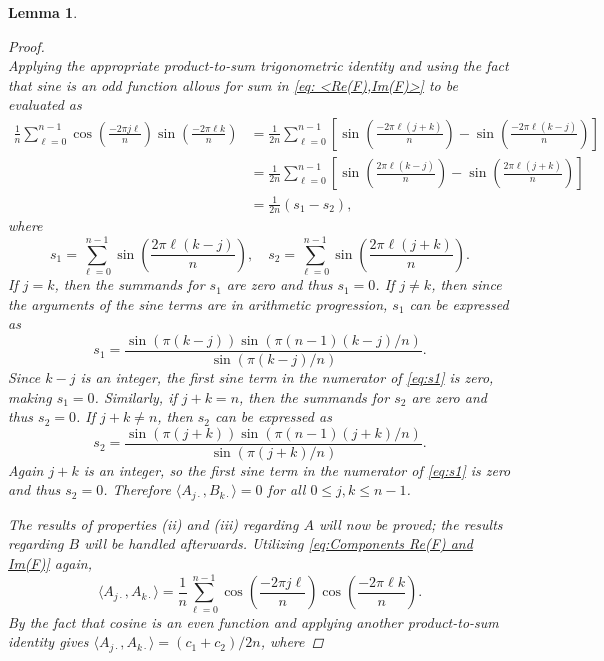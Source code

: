 \documentclass[12pt]{article}
\newtheorem{lemma}{Lemma}[section]
\begin{document}
\begin{lemma}
\begin{proof}
\begin{equation}
\label{eq: <Re(F),Im(F)>}
\end{equation}
Applying the appropriate product-to-sum trigonometric identity and using the fact that sine is an odd function allows for sum in \eqref{eq: <Re(F),Im(F)>} to be evaluated as
\begin{align*}
\frac{1}{n}\sum_{\ell=0}^{n-1}\cos\left(\frac{-2\pi{j\ell}}{n}\right)\sin\left(\frac{-2\pi{\ell{k}}}{n}\right) &= \frac{1}{2n}\sum_{\ell=0}^{n-1}\left[\sin\left(\frac{-2\pi{\ell(j+k)}}{n}\right) - \sin\left(\frac{-2\pi{\ell(k-j)}}{n}\right)\right] \\
&= \frac{1}{2n}\sum_{\ell=0}^{n-1}\left[\sin\left(\frac{2\pi{\ell(k-j)}}{n}\right) - \sin\left(\frac{2\pi{\ell(j+k)}}{n}\right)\right] \\
&= \frac{1}{2n}\left(s_1 - s_2\right),
\end{align*}
where
\[s_1 = \sum_{\ell=0}^{n-1}\sin\left(\frac{2\pi{\ell(k-j)}}{n}\right), \quad s_2 = \sum_{\ell=0}^{n-1}\sin\left(\frac{2\pi{\ell(j+k)}}{n}\right).\]
If $j = k$, then the summands for $s_1$ are zero and thus $s_1 = 0$. If $j \neq k$, then since the arguments of the sine terms are in arithmetic progression, $s_1$ can be expressed as
\begin{equation}
s_1 = \frac{\sin(\pi{(k-j)})\sin(\pi(n-1)(k-j)/n)}{\sin(\pi{(k-j)}/n)}.
\label{eq:s1}
\end{equation}
Since $k-j$ is an integer, the first sine term in the numerator of \eqref{eq:s1} is zero, making $s_1 = 0$. Similarly, if $j + k = n$, then the summands for $s_2$ are zero and thus $s_2 = 0$. If $j + k \neq n$, then $s_2$ can be expressed as
\begin{equation}
s_2 = \frac{\sin(\pi(j+k))\sin(\pi(n-1)(j+k)/n)}{\sin(\pi{(j+k)}/n)}.
\label{eq:s2}
\end{equation}
Again $j+k$ is an integer, so the first sine term in the numerator of \eqref{eq:s1} is zero and thus $s_2 = 0$.  Therefore $\langle A_{j\cdot}, B_{k\cdot}\rangle = 0$ for all $0 \leq j,k \leq n-1$. \par
The results of properties (ii) and (iii) regarding $A$ will now be proved; the results regarding $B$ will be handled afterwards. Utilizing \eqref{eq:Components Re(F) and Im(F)} again,
\begin{equation}
\langle A_{j\cdot}, A_{k\cdot}\rangle = \frac{1}{n}\sum_{\ell=0}^{n-1}\cos\left(\frac{-2\pi{j\ell}}{n}\right)\cos\left(\frac{-2\pi{\ell{k}}}{n}\right).
\label{eq: <A,A>}
\end{equation}
By the fact that cosine is an even function and applying another product-to-sum identity gives $\langle A_{j\cdot}, A_{k\cdot}\rangle = (c_1 + c_2)/2n$, where

\end{proof}
\end{lemma}
\end{document}
